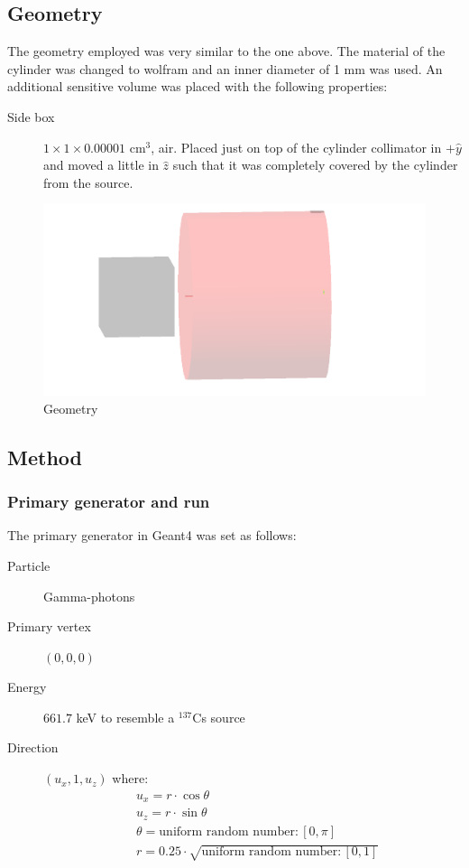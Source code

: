 \documentclass[a4paper]{article}
\begin{document}
\subsection{Geometry}
The geometry employed was very similar to the one above. The material of the cylinder was changed to wolfram and an inner diameter of 1 mm was used. An additional sensitive volume was placed with the following properties:
\begin{description}
  \item[Side box] $1\times1\times0.00001$ cm$^3$, air. Placed just on top of the cylinder collimator in $+\hat{y}$ and moved a little in $\hat{z}$ such that it was completely covered by the cylinder from the source.
\end{description}
\begin{figure}[H]
  \centering
  \includegraphics[width=\textwidth]{geometry2.png}
  \caption{Geometry}
  \label{fig:geometry2}
\end{figure}
\subsection{Method}
\subsubsection{Primary generator and run}
The primary generator in Geant4 was set as follows:
\begin{description}
  \item[Particle] Gamma-photons
  \item[Primary vertex] $(0,0,0)$
  \item[Energy] $661.7$ keV to resemble a $^{137}$Cs source
  \item[Direction] $(u_x, 1, u_z)$ where:
  \begin{align}
    &u_x = r \cdot \cos \theta \\
    &u_z = r \cdot \sin \theta \\
    &\theta = \text{uniform random number}: [0, \pi] \\
    &r = 0.25 \cdot \sqrt{\text{uniform random number}: [0, 1]}
    \label{eq:GDir2}
  \end{align}
\end{description}
\end{document}
